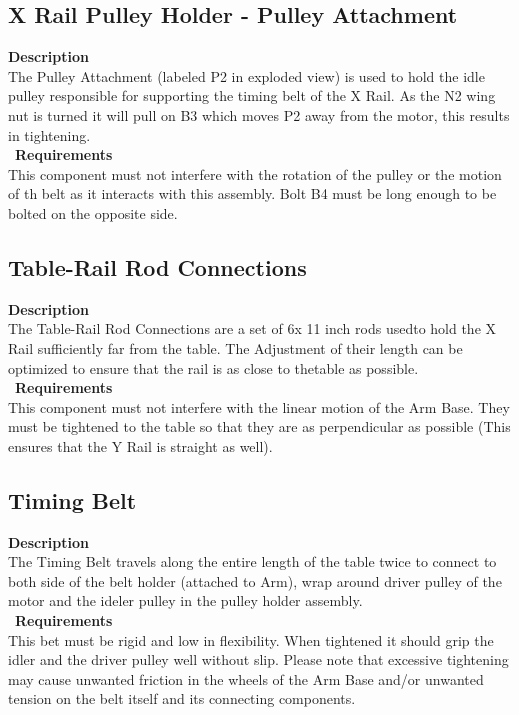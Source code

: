 \documentclass[titlepage]{article}
\begin{document}
\begin{center}
\begin{center}
\begin{center}
\subsection{X Rail Pulley Holder - Pulley Attachment}
\textbf{Description}\\
The Pulley Attachment (labeled P2 in exploded view) is used to hold the idle pulley responsible for supporting the timing belt of the X Rail. As the N2 wing nut is turned it will pull on B3 which moves P2 away from the motor, this results in tightening.\\\
\textbf{Requirements}\\
This component must not interfere with the rotation of the pulley or the motion of th belt as it interacts with this assembly. Bolt B4 must be long enough to be bolted on the opposite side. 
\begin{center}


\subsection{Table-Rail Rod Connections}
\textbf{Description}\\
The Table-Rail Rod Connections are a set of 6x 11 inch rods usedto hold the X Rail sufficiently far from the table. The Adjustment of their length can be optimized to ensure that the rail is as close to thetable as possible.\\\
\textbf{Requirements}\\
This component must not interfere with the linear motion of the Arm Base. They must be tightened to the table so that they are as perpendicular as possible (This ensures that the Y Rail is straight as well).
\begin{center}


\subsection{Timing Belt}
\textbf{Description}\\
The Timing Belt travels along the entire length of the table twice to connect to both side of the belt holder (attached to Arm), wrap around driver pulley of the motor and the ideler pulley in the pulley holder assembly.\\\
\textbf{Requirements}\\
This bet must be rigid and low in flexibility. When tightened it should grip the idler and the driver pulley well without slip. Please note that excessive tightening may cause unwanted friction in the wheels of the Arm Base and/or unwanted tension on the belt itself and its connecting components.
\begin{center}


\end{center}
\end{center}
\end{center}
\end{center}
\end{center}
\end{center}
\end{document}
